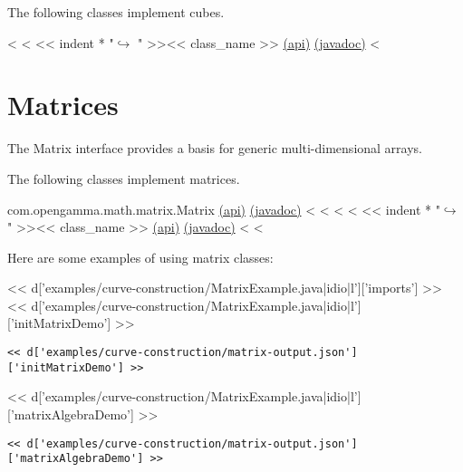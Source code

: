 The following classes implement cubes.

\begin{fullwidth}
<%
<%
<< indent * "$\hookrightarrow$ " >><< class_name >> \href{http://docs-static.opengamma.com/<< OG_VERSION >>/analytics/api/<< package_name >>.html#class-<<class_name>>}{(api)} \href{http://docs-static.opengamma.com/<< OG_VERSION >>/java/javadocs/<< class_name.replace(".","/") >>.html}{(javadoc)}
<%
\end{fullwidth}

\section{Matrices}

The Matrix interface provides a basis for generic multi-dimensional arrays.

The following classes implement matrices.

\begin{fullwidth}
com.opengamma.math.matrix.Matrix \href{http://docs-static.opengamma.com/<< OG_VERSION >>/analytics/api/com.opengamma.math.matrix.Matrix.html#class-com.opengamma.math.matrix.Matrix}{(api)} \href{http://docs-static.opengamma.com/<< OG_VERSION >>/analytics/javadoc/com/opengamma/math/matrix/Matrix}{(javadoc)}
<%
<%
<%
<%
<< indent * "$\hookrightarrow$ " >><< class_name >> \href{http://docs-static.opengamma.com/<< OG_VERSION >>/analytics/api/<< package_name >>.html#class-<<class_name>>}{(api)} \href{http://docs-static.opengamma.com/<< OG_VERSION >>/java/javadocs/<< class_name.replace(".","/") >>.html}{(javadoc)}
<%
<%

\end{fullwidth}


Here are some examples of using matrix classes:

<< d['examples/curve-construction/MatrixExample.java|idio|l']['imports'] >>
<< d['examples/curve-construction/MatrixExample.java|idio|l']['initMatrixDemo'] >>

\begin{Verbatim}
<< d['examples/curve-construction/matrix-output.json']['initMatrixDemo'] >>
\end{Verbatim}

<< d['examples/curve-construction/MatrixExample.java|idio|l']['matrixAlgebraDemo'] >>

\begin{Verbatim}
<< d['examples/curve-construction/matrix-output.json']['matrixAlgebraDemo'] >>
\end{Verbatim}
